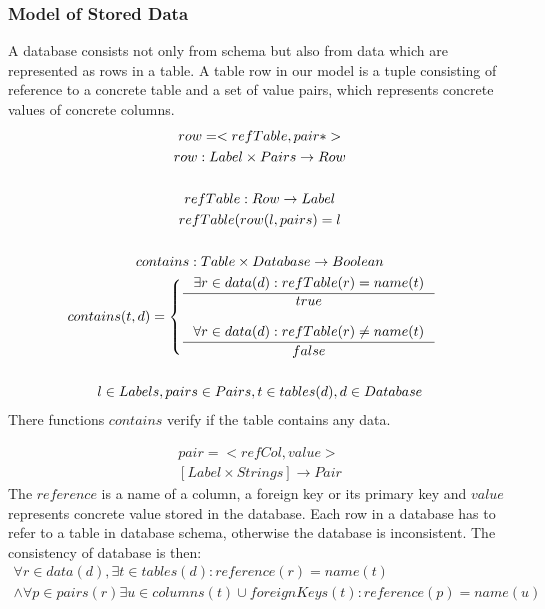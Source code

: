 \documentclass[11pt]{article}
\begin{document}

\subsubsection{Model of Stored Data}
A database consists not only from schema but also from data which are represented as rows in a table. A table row in our model is a tuple consisting of reference to a concrete table and a set of value pairs, which represents concrete values of concrete columns.
\begin{gather*}
row = < refTable, pair* > \\
row : Label \times Pairs \rightarrow Row \\ \\
refTable : Row \rightarrow Label \\
refTable(row(l, pairs) = l \\ \\
contains : Table \times Database \rightarrow Boolean \\
contains(t, d) = \begin{cases}
 \inference{\exists r \in data(d) : refTable(r) = name(t) }{true} \\ \\
  \inference{\forall r \in data(d) : refTable(r) \neq name(t)}{false}
 \end{cases} \\ \\
 l \in Labels, pairs \in Pairs, t \in tables(d), d \in Database
\end{gather*}
There functions $contains$ verify if the table contains any data.

\begin{gather*}
pair = < refCol, value > \\
[Label \times Strings] \rightarrow Pair
\end{gather*}
The $reference $ is a name of a column, a foreign key or its primary key and $value$ represents concrete value stored in the database. Each row in a database has to refer to a table in database schema, otherwise the database is inconsistent. The consistency of database is then:
\begin{equation*}
\begin{gathered}
\forall r \in data(d), \exists t \in tables(d) : reference(r) = name(t) \\ \wedge \forall p \in pairs(r) \exists u \in columns(t) \cup foreignKeys(t) : reference(p) = name(u) 
\end{gathered}
\end{equation*}
\end{document}

